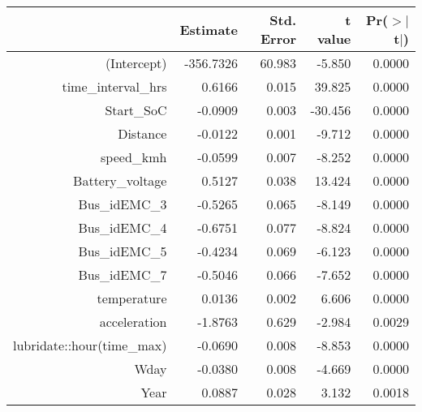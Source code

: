 \begin{table}[ht]
\centering
\begin{tabular}{rrrrr}
  \hline
 & Estimate & Std. Error & t value & Pr($>$$|$t$|$) \\ 
  \hline
(Intercept) & -356.7326 & 60.983 & -5.850 & 0.0000 \\ 
  time\_interval\_hrs & 0.6166 & 0.015 & 39.825 & 0.0000 \\ 
  Start\_SoC & -0.0909 & 0.003 & -30.456 & 0.0000 \\ 
  Distance & -0.0122 & 0.001 & -9.712 & 0.0000 \\ 
  speed\_kmh & -0.0599 & 0.007 & -8.252 & 0.0000 \\ 
  Battery\_voltage & 0.5127 & 0.038 & 13.424 & 0.0000 \\ 
  Bus\_idEMC\_3 & -0.5265 & 0.065 & -8.149 & 0.0000 \\ 
  Bus\_idEMC\_4 & -0.6751 & 0.077 & -8.824 & 0.0000 \\ 
  Bus\_idEMC\_5 & -0.4234 & 0.069 & -6.123 & 0.0000 \\ 
  Bus\_idEMC\_7 & -0.5046 & 0.066 & -7.652 & 0.0000 \\ 
  temperature & 0.0136 & 0.002 & 6.606 & 0.0000 \\ 
  acceleration & -1.8763 & 0.629 & -2.984 & 0.0029 \\ 
  lubridate::hour(time\_max) & -0.0690 & 0.008 & -8.853 & 0.0000 \\ 
  Wday & -0.0380 & 0.008 & -4.669 & 0.0000 \\ 
  Year & 0.0887 & 0.028 & 3.132 & 0.0018 \\ 
   \hline
\end{tabular}
\end{table}
